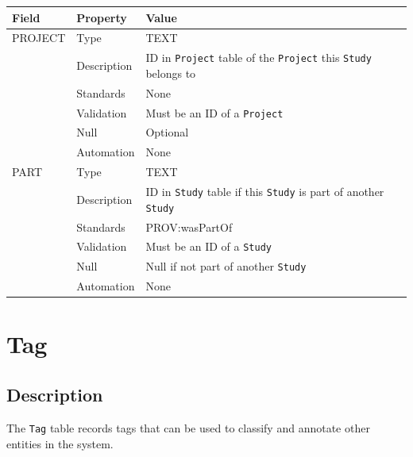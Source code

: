 \documentclass[
]{article}
\newcounter{none}
\begin{document}
{\def\LTcaptype{none} 
\begin{longtable}[]{@{}
  >{\raggedright\arraybackslash}p{}
  >{\raggedright\arraybackslash}p{}
  >{\raggedright\arraybackslash}p{}@{}}
\toprule\noalign{}
\begin{minipage}[b]{\linewidth}\raggedright
Field
\end{minipage} & \begin{minipage}[b]{\linewidth}\raggedright
Property
\end{minipage} & \begin{minipage}[b]{\linewidth}\raggedright
Value
\end{minipage} \\
\midrule\noalign{}
\endhead
\bottomrule\noalign{}
\endlastfoot
PROJECT & Type & TEXT \\
& Description & ID in \texttt{Project} table of the \texttt{Project}
this \texttt{Study} belongs to \\
& Standards & None \\
& Validation & Must be an ID of a \texttt{Project} \\
& Null & Optional \\
& Automation & None \\
PART & Type & TEXT \\
& Description & ID in \texttt{Study} table if this \texttt{Study} is
part of another \texttt{Study} \\
& Standards & PROV:wasPartOf \\
& Validation & Must be an ID of a \texttt{Study} \\
& Null & Null if not part of another \texttt{Study} \\
& Automation & None \\
\end{longtable}
}

\section{Tag}\label{tag}

\subsection{Description}\label{description-33}

The \texttt{Tag} table records tags that can be used to classify and
annotate other entities in the system.
\end{document}
